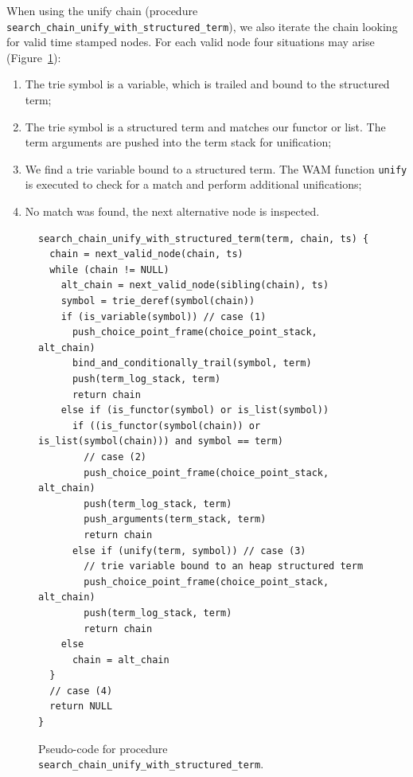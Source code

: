 \begin{samepage}
When using the unify chain (procedure \texttt{search\_chain\_unify\_with\_structured\_term}),
we also iterate the chain looking for valid time stamped nodes. For each valid node
four situations may arise (Figure~\ref{fig:search_chain_unify_with_structured_term}):

\begin{enumerate}
  \item The trie symbol is a variable, which is trailed and bound to the structured term;
  \item The trie symbol is a structured term and matches our functor or list.
  The term arguments are pushed into the term stack for unification;
  \item We find a trie variable bound to a structured term. The WAM function \texttt{unify}
  is executed to check for a match and perform additional unifications;
  \item No match was found, the next alternative node is inspected.
\end{enumerate}
\end{samepage}

\begin{figure}[ht]
\begin{Verbatim}
search_chain_unify_with_structured_term(term, chain, ts) {
  chain = next_valid_node(chain, ts)
  while (chain != NULL)
    alt_chain = next_valid_node(sibling(chain), ts)
    symbol = trie_deref(symbol(chain))
    if (is_variable(symbol)) // case (1)
      push_choice_point_frame(choice_point_stack, alt_chain)
      bind_and_conditionally_trail(symbol, term)
      push(term_log_stack, term)
      return chain
    else if (is_functor(symbol) or is_list(symbol))
      if ((is_functor(symbol(chain)) or is_list(symbol(chain))) and symbol == term)
        // case (2)
        push_choice_point_frame(choice_point_stack, alt_chain)
        push(term_log_stack, term)
        push_arguments(term_stack, term)
        return chain
      else if (unify(term, symbol)) // case (3)
        // trie variable bound to an heap structured term
        push_choice_point_frame(choice_point_stack, alt_chain)
        push(term_log_stack, term)
        return chain
    else
      chain = alt_chain
  }
  // case (4)
  return NULL
}
\end{Verbatim}
\caption{Pseudo-code for procedure \texttt{search\_chain\_unify\_with\_structured\_term}.}
\label{fig:search_chain_unify_with_structured_term}
\end{figure}

